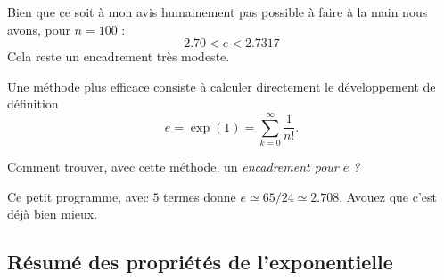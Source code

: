 Bien que ce soit à mon avis humainement pas possible à faire à la main nous avons, pour \( n=100\) :
\begin{equation}
    2.70<e<2.7317
\end{equation}
Cela reste un encadrement très modeste.

Une méthode plus efficace consiste à calculer directement le développement de définition
\begin{equation}
    e=\exp(1)=\sum_{k=0}^{\infty}\frac{1}{ n! }.
\end{equation}


\begin{probleme}
    Comment trouver, avec cette méthode, un \emph{encadrement pour \( e\) ?}
\end{probleme}

Ce petit programme, avec \( 5\) termes donne \( e\simeq 65/24\simeq 2.708\). Avouez que c'est déjà bien mieux.

\subsection{Résumé des propriétés de l'exponentielle}

